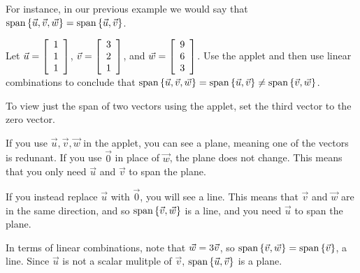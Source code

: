\documentclass{ximera}
\begin{document}
\begin{exploration}
  For instance, in our previous example we would say that $\sspan\set{\vect{u},\vect{v},\vect{w}}=\sspan\set{\vect{u},\vect{v}}$.



\begin{example}
  Let $\vect{u}=\startmat{r} 1 \\ 1 \\ 1 \stopmat$,
  $\vect{v}=\startmat{r} 3 \\ 2 \\ 1 \stopmat$, and
  $\vect{w}=\startmat{r} 9 \\ 6 \\ 3 \stopmat$.
  Use the applet and then use linear combinations to conclude that
  $\sspan\set{\vect{u},\vect{v},\vect{w}} =
  \sspan\set{\vect{u},\vect{v}}\neq\sspan\set{\vec{v},\vec{w}}$.
\end{example}

\begin{hint}

  To view just the span of two vectors using the applet, set the third vector to the zero vector. 

\end{hint}

\begin{center}
\end{center}


\begin{solution}
  
  If you use $\vec{u}, \vec{v}, \vec{w}$ in the applet, you can see a plane, meaning one of the vectors is redunant. If you use $\vec{0}$ in place of $\vec{w}$, the plane does not change. This means that you only need $\vec{u}$ and $\vec{v}$ to span the plane.
  
  If you instead replace $\vec{u}$ with $\vec{0}$, you will see a line. This means that $\vec{v}$ and $\vec{w}$ are in the same direction, and so $\sspan\set{\vec{v},\vec{w}}$ is a line, and you need $\vec{u}$ to span the plane.
  
  In terms of linear combinations, note that $\vect{w} = 3\vect{v}$, so $\sspan\set{\vec{v},\vec{w}}=\sspan\set{\vec{v}}$, a line. Since $\vec{u}$ is not a scalar mulitple of $\vec{v}$, $\sspan\set{\vec{u},\vec{v}}$ is a plane.
  
  
\end{solution}

\end{exploration}
\end{document}
